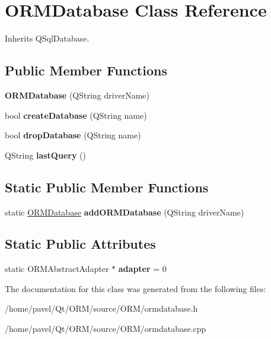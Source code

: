 \hypertarget{class_o_r_m_database}{\section{O\-R\-M\-Database Class Reference}
\label{class_o_r_m_database}
}


Inherits Q\-Sql\-Database.

\subsection*{Public Member Functions}
\begin{DoxyCompactItemize}
\item 
\hypertarget{class_o_r_m_database_a1bfc00123a5d92e1828ebb972f0612b4}{{\bfseries O\-R\-M\-Database} (Q\-String driver\-Name)}\label{class_o_r_m_database_a1bfc00123a5d92e1828ebb972f0612b4}

\item 
\hypertarget{class_o_r_m_database_a9c500c24e76bac9fd8d0e86865318293}{bool {\bfseries create\-Database} (Q\-String name)}\label{class_o_r_m_database_a9c500c24e76bac9fd8d0e86865318293}

\item 
\hypertarget{class_o_r_m_database_affc7579b55a4430de1cac925f02ba1c9}{bool {\bfseries drop\-Database} (Q\-String name)}\label{class_o_r_m_database_affc7579b55a4430de1cac925f02ba1c9}

\item 
\hypertarget{class_o_r_m_database_af3f07807f8da3071587bfe232ed1d34d}{Q\-String {\bfseries last\-Query} ()}\label{class_o_r_m_database_af3f07807f8da3071587bfe232ed1d34d}

\end{DoxyCompactItemize}
\subsection*{Static Public Member Functions}
\begin{DoxyCompactItemize}
\item 
\hypertarget{class_o_r_m_database_ac560b3727f23580cc5c28e70c7460cb4}{static \hyperlink{class_o_r_m_database}{O\-R\-M\-Database} {\bfseries add\-O\-R\-M\-Database} (Q\-String driver\-Name)}\label{class_o_r_m_database_ac560b3727f23580cc5c28e70c7460cb4}

\end{DoxyCompactItemize}
\subsection*{Static Public Attributes}
\begin{DoxyCompactItemize}
\item 
\hypertarget{class_o_r_m_database_a84ddcb13a085bc15c8eeba718574e312}{static O\-R\-M\-Abstract\-Adapter $\ast$ {\bfseries adapter} = 0}\label{class_o_r_m_database_a84ddcb13a085bc15c8eeba718574e312}

\end{DoxyCompactItemize}


The documentation for this class was generated from the following files\-:\begin{DoxyCompactItemize}
\item 
/home/pavel/\-Qt/\-O\-R\-M/source/\-O\-R\-M/ormdatabase.\-h\item 
/home/pavel/\-Qt/\-O\-R\-M/source/\-O\-R\-M/ormdatabase.\-cpp\end{DoxyCompactItemize}
